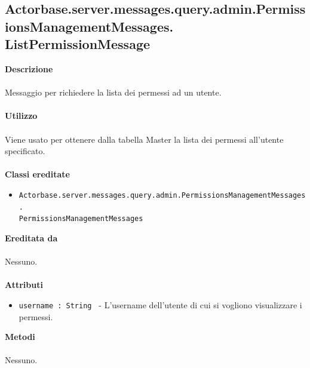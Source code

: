 \documentclass[a4paper]{article}
\begin{document}
\subsection{Actorbase.server.messages.query.admin.PermissionsManagementMessages.
\newline ListPermissionMessage}
		\textbf{Descrizione}
			\\ \\
			Messaggio per richiedere la lista dei permessi ad un utente.
			\\ \\
		\textbf{Utilizzo}
			\\ \\
			Viene usato per ottenere dalla tabella Master la lista dei permessi all'utente specificato.
			\\ \\
		\textbf{Classi ereditate}
			\begin{itemize}
				\item \texttt{Actorbase.server.messages.query.admin.PermissionsManagementMessages.}
				\\ \texttt{PermissionsManagementMessages}\end{itemize}
		\textbf{Ereditata da}
			\\ \\
			Nessuno.
			\\ \\
		\textbf{Attributi}
			\begin{itemize}
				\item \texttt{username : String } - L'username dell'utente di cui si vogliono visualizzare i permessi.
			\end{itemize}
		\textbf{Metodi}
			\\ \\
			Nessuno.
			
\end{document}

